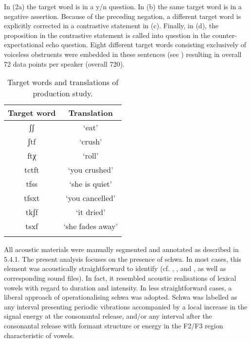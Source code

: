 In (2a) the target word is in a y/n question. In (b) the same target word is in a negative assertion. Because of the preceding negation, a different target word is explicitly corrected in a contrastive statement in (c). Finally, in (d), the proposition in the contrastive statement is called into question in the counter-expectational echo question. Eight different target words consisting exclusively of voiceless obstruents were embedded in these sentences (see ) resulting in overall 72 data points per speaker (overall 720).

\begin{table}
  \begin{tabular}{cc}
    \lsptoprule
    Target word  & Translation \\
    \midrule
ʃʃ & ‘eat'\\
ʃtf & ‘crush'\\
ftχ  & ‘roll'\\
tctft & ‘you crushed'\\
tfss & ‘she is quiet'\\
tfsxt & ‘you cancelled'\\
tkʃf & ‘it dried'\\
tsxf & ‘she fades away'\\
\lspbottomrule
  \end{tabular}
  \caption{Target words and translations of production study.}
  \label{tab:6.2}
\end{table} 

All acoustic materials were manually segmented and annotated as described in 5.4.1. The present analysis focuses on the presence of schwa. In most cases, this element was acoustically straightforward to identify (cf. , , and , as well as corresponding sound files). In fact, it resembled acoustic realisations of lexical vowels with regard to duration and intensity. In less straightforward cases, a liberal approach of operationalising schwa was adopted. Schwa was labelled as any interval presenting periodic vibrations accompanied by a local increase in the signal energy at the consonantal release, and/or any interval after the consonantal release with formant structure or energy in the F2/F3 region characteristic of vowels.


